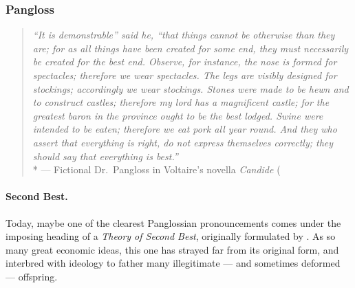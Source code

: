 
\subsubsection{Pangloss}
	\label{sec:Pangloss}

\begin{quotation}
	\emph{``It is demonstrable'' said he, ``that things cannot be otherwise than they are;
for as all things have been created for some end, they must necessarily be created for the best end.
	Observe, for instance, the nose is formed for spectacles;
therefore we wear spectacles.
	The legs are visibly designed for stockings;
accordingly we wear stockings.
	Stones were made to be hewn and to construct castles;
therefore my lord has a magnificent castle;
for the greatest baron in the province ought to be the best lodged.
	Swine were intended to be eaten;
therefore we eat pork all year round.
And they who assert that everything is right, do not express themselves correctly;
they should say that everything is best.''}
	\\*
	--- Fictional Dr.\ Pangloss in Voltaire's novella \emph{Candide} (\citeyearpar[K125]{Voltaire1759}
\end{quotation}

\paragraph{Second Best.}
Today, maybe one of the clearest Panglossian pronouncements comes under the imposing heading of a \emph{Theory of Second Best}, originally formulated by \cite{Lancaster1956}.
As so many great economic ideas, this one has strayed far from its original form, and interbred with ideology to father many illegitimate --- and sometimes  deformed --- offspring.

